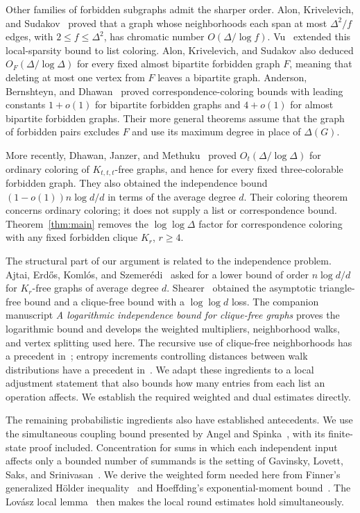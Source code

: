 Other families of forbidden subgraphs admit the sharper order.
Alon, Krivelevich, and Sudakov~\cite{AKS1999} proved that a graph
whose neighborhoods each span at most $\Delta^2/f$ edges, with
$2\le f\le\Delta^2$, has chromatic number $O(\Delta/\log f)$.
Vu~\cite{Vu2002} extended this local-sparsity bound to list coloring.
Alon, Krivelevich, and Sudakov also deduced
$O_F(\Delta/\log\Delta)$ for every fixed almost bipartite forbidden
graph $F$, meaning that deleting at most one vertex from $F$ leaves a
bipartite graph. Anderson, Bernshteyn, and
Dhawan~\cite{AndersonBernshteynDhawan2023,AndersonBernshteynDhawan}
proved correspondence-coloring bounds with leading constants
$1+o(1)$ for bipartite forbidden graphs and $4+o(1)$ for almost
bipartite forbidden graphs. Their more general theorems assume that
the graph of forbidden pairs excludes $F$ and use its maximum degree
in place of $\Delta(G)$.

More recently, Dhawan, Janzer, and
Methuku~\cite[Theorems~1.4 and~1.5]{DhawanJanzerMethuku} proved
$O_t(\Delta/\log\Delta)$ for ordinary coloring of $K_{t,t,t}$-free
graphs, and hence for every fixed three-colorable forbidden graph.
They also obtained the independence bound
$(1-o(1))n\log d/d$ in terms of the average degree $d$.
Their coloring theorem
concerns ordinary coloring; it does not supply a list or correspondence
bound. Theorem~\ref{thm:main} removes the $\log\log\Delta$ factor
for correspondence coloring with any fixed forbidden clique $K_r$, $r\ge4$.

The structural part of our argument is related to the independence
problem. Ajtai, Erd\H{o}s, Koml\'os, and
Szemer\'edi~\cite{AEKS1981} asked for a lower bound of order
$n\log d/d$ for $K_r$-free graphs of average degree $d$.
Shearer~\cite{Shearer1983,Shearer1995} obtained the asymptotic
triangle-free bound and a clique-free bound with a
$\log\log d$ loss. The companion manuscript
\emph{A logarithmic independence bound for clique-free graphs}
\cite{OpenAIIndependence} proves the logarithmic bound and develops
the weighted multipliers, neighborhood walks, and vertex splitting
used here. The recursive use of clique-free neighborhoods has a
precedent in~\cite[Section~3]{AEKS1981}; entropy increments controlling
distances between walk distributions have a precedent
in~\cite[Section~2, Theorem~8]{BDKY2015}. We adapt these ingredients
to a local adjustment statement that also bounds how many entries
from each list an operation affects. We establish the required
weighted and dual estimates directly.

The remaining probabilistic ingredients also have established
antecedents. We use the simultaneous coupling bound presented by
Angel and Spinka~\cite{AngelSpinka}, with its finite-state proof
included. Concentration for sums in which each independent input affects
only a bounded number of summands is the setting of
Gavinsky, Lovett, Saks, and Srinivasan~\cite{GavinskyReadK}.
We derive the weighted form needed here from Finner's generalized
H\"older inequality~\cite{Finner} and Hoeffding's exponential-moment
bound~\cite{Hoeffding1963}. The Lov\'asz local
lemma~\cite{ErdosLovasz1975} then makes the local round estimates
hold simultaneously.
